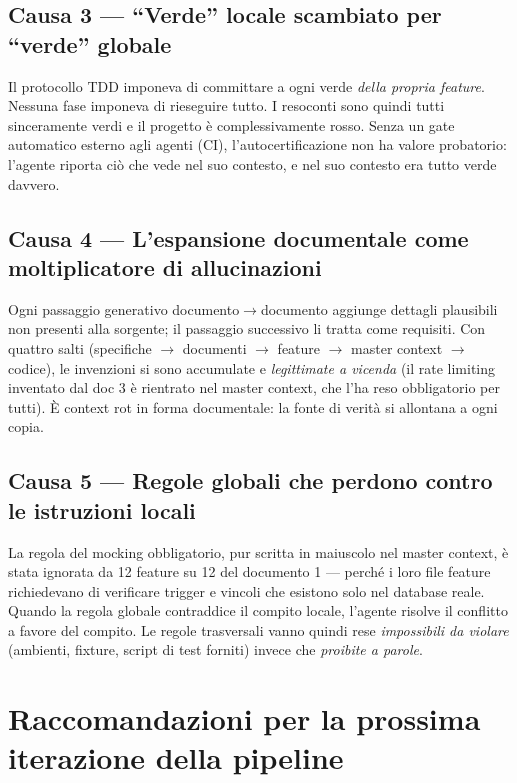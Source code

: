 \documentclass[11pt,a4paper]{article}
\begin{document}
\subsection{Causa 3 --- ``Verde'' locale scambiato per ``verde'' globale}
Il protocollo TDD imponeva di committare a ogni verde \emph{della propria feature}. Nessuna fase imponeva di rieseguire tutto. I resoconti sono quindi tutti sinceramente verdi e il progetto \`e complessivamente rosso. Senza un gate automatico esterno agli agenti (CI), l'autocertificazione non ha valore probatorio: l'agente riporta ci\`o che vede nel suo contesto, e nel suo contesto era tutto verde davvero.

\subsection{Causa 4 --- L'espansione documentale come moltiplicatore di allucinazioni}
Ogni passaggio generativo documento$\to$documento aggiunge dettagli plausibili non presenti alla sorgente; il passaggio successivo li tratta come requisiti. Con quattro salti (specifiche $\to$ documenti $\to$ feature $\to$ master context $\to$ codice), le invenzioni si sono accumulate e \emph{legittimate a vicenda} (il rate limiting inventato dal doc 3 \`e rientrato nel master context, che l'ha reso obbligatorio per tutti). \`E context rot in forma documentale: la fonte di verit\`a si allontana a ogni copia.

\subsection{Causa 5 --- Regole globali che perdono contro le istruzioni locali}
La regola del mocking obbligatorio, pur scritta in maiuscolo nel master context, \`e stata ignorata da 12 feature su 12 del documento 1 --- perch\'e i loro file feature richiedevano di verificare trigger e vincoli che esistono solo nel database reale. Quando la regola globale contraddice il compito locale, l'agente risolve il conflitto a favore del compito. Le regole trasversali vanno quindi rese \emph{impossibili da violare} (ambienti, fixture, script di test forniti) invece che \emph{proibite a parole}.

\section{Raccomandazioni per la prossima iterazione della pipeline}
\end{document}
